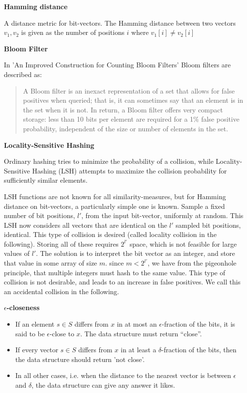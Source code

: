 \documentclass[a4paper,11pt]{article}
\begin{document}
\begin{description}
\item \textbf{Hamming distance}

A distance metric for bit-vectors. The Hamming distance between two vectors $v_1, v_2$ is given as the number of positions $i$ where $v_1[i] \neq v_2[i]$

\item \textbf{Bloom Filter}

In 'An Improved Construction for Counting Bloom Filters' \cite{paper:bloom} Bloom filters are described as:
\begin{quotation}
A Bloom filter is an inexact representation of a set that allows for false positives when queried; that is, it can sometimes say that an element is in the set when it is not. In return, a Bloom filter offers very compact storage: less than 10 bits per element are required for a 1\% false positive probability, independent of the size or number of elements in the set.
\end{quotation}


\item \textbf{Locality-Sensitive Hashing}
\label{sec:lsh}

Ordinary hashing tries to minimize the probability of a collision, while Locality-Sensitive Hashing (LSH) attempts to maximize the collision probability for sufficiently similar elements.

LSH functions are not known for all similarity-measures, but for Hamming distance on bit-vectors, a particularly simple one is known.
Sample a fixed number of bit positions, $l'$, from the input bit-vector, uniformly at random. This LSH now considers all vectors that are identical on the $l'$ sampled bit positions, identical. This type of collision is desired (called locality collision in the following). Storing all of these requires $2^{l'}$ space, which is not feasible for large values of $l'$. The solution is to interpret the bit vector as an integer, and store that value in some array of size $m$. since $m < 2^{l'}$, we have from the pigeonhole principle, that multiple integers must hash to the same value. This type of collision is not desirable, and leads to an increase in false positives. We call this an accidental collision in the following.

\item \textbf{$\epsilon$-closeness}
  \begin{itemize}
    \item If an element $s \in S$ differs from $x$ in at most an $\epsilon$-fraction of the bits, it is said to be $\epsilon$-close to $x$. The data structure must return “close”.
    \item If every vector $s \in S$ differs from $x$ in at least a $\delta$-fraction of the bits, then the data structure should return 'not close'.
    \item In all other cases, i.e. when the distance to the nearest vector is between $\epsilon$ and $\delta$, the data structure can give any answer it likes.
  \end{itemize}

\end{description}
\end{document}
